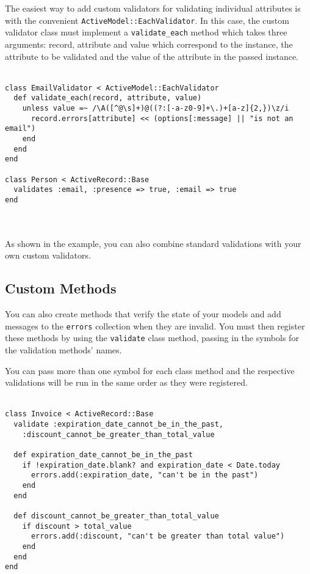 \documentclass[10pt]{book}
\begin{document}
The easiest way to add custom validators for validating individual attributes is with the convenient \texttt{ActiveModel::EachValidator}. In this case, the custom validator class must implement a \texttt{validate\_each}  method which takes three arguments: record, attribute and value which  correspond to the instance, the attribute to be validated and the value  of the attribute in the passed instance.
\\ \\
\begin{minipage}{\textwidth}{\scriptsize
\begin{verbatim}
class EmailValidator < ActiveModel::EachValidator
  def validate_each(record, attribute, value)
    unless value =~ /\A([^@\s]+)@((?:[-a-z0-9]+\.)+[a-z]{2,})\z/i
      record.errors[attribute] << (options[:message] || "is not an email")
    end
  end
end
 
class Person < ActiveRecord::Base
  validates :email, :presence => true, :email => true
end
\end{verbatim}}
\end{minipage}
\\ \\

As shown in the example, you can also combine standard validations with your own custom validators.

\subsection{ Custom Methods}

You can also create methods that verify the state of your models and add messages to the \texttt{errors} collection when they are invalid. You must then register these methods by using the \texttt{validate} class method, passing in the symbols for the validation methods’ names.

You can pass more than one symbol for each class method and the  respective validations will be run in the same order as they were  registered.
\\ \\
\begin{minipage}{\textwidth}{\scriptsize
\begin{verbatim}
class Invoice < ActiveRecord::Base
  validate :expiration_date_cannot_be_in_the_past,
    :discount_cannot_be_greater_than_total_value
 
  def expiration_date_cannot_be_in_the_past
    if !expiration_date.blank? and expiration_date < Date.today
      errors.add(:expiration_date, "can't be in the past")
    end
  end
 
  def discount_cannot_be_greater_than_total_value
    if discount > total_value
      errors.add(:discount, "can't be greater than total value")
    end
  end
end
\end{verbatim}}
\end{minipage}
\\ \\
\end{document}
